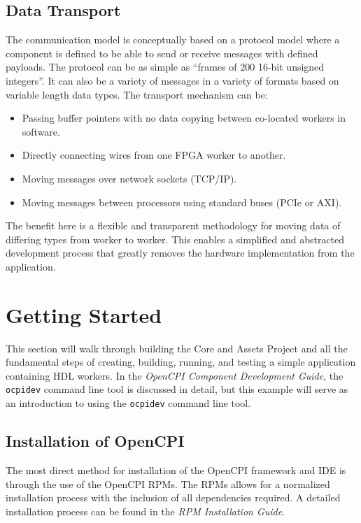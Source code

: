 \subsection{Data Transport}
\label{subsec:Data_Transport}
The communication model is conceptually based on a protocol model where a component is defined to be able to send or receive messages
with defined payloads.
The protocol can be as simple as ``frames of 200 16-bit unsigned integers''.
It can also be a variety of messages in a variety of formats based on variable length data types.
The transport mechanism can be:
\begin{itemize}
\item Passing buffer pointers with no data copying between co-located workers in software.
\item Directly connecting wires from one FPGA worker to another.
\item Moving messages over network sockets (TCP/IP).
\item Moving messages between processors using standard buses (PCIe or AXI).
\end{itemize}

The benefit here is a flexible and transparent methodology for moving data of differing types from worker to worker. This enables a simplified and abstracted development process that greatly removes the hardware implementation from the application.

\newpage
\section{Getting Started}
This section will walk through building the Core and Assets Project and all the fundamental steps of creating, building, running, and testing a simple application containing HDL workers. In the \textit{OpenCPI Component Development Guide}, the \verb+ocpidev+ command line tool is discussed in detail, but this example will serve as an introduction to using the \verb+ocpidev+ command line tool.

\subsection{Installation of OpenCPI}
The most direct method for installation of the OpenCPI framework and IDE is through the use of the OpenCPI RPMs. The RPMs allows for a normalized installation process with the inclusion of all dependencies required. A detailed installation process can be found in the \textit{RPM Installation Guide}.

